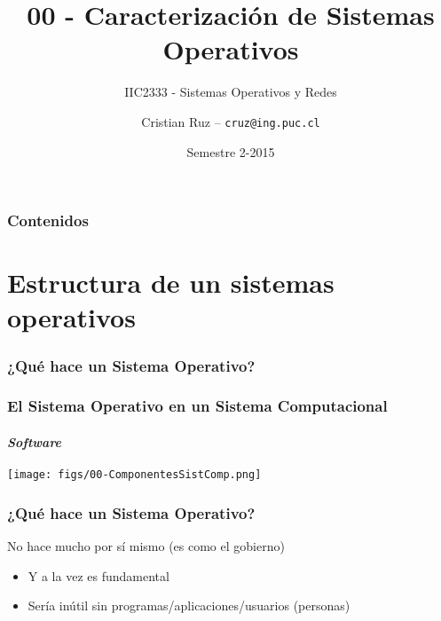 \documentclass[letter]{beamer}
\title[IIC2333] %
{00 - Caracterización de Sistemas Operativos}
\subtitle{IIC2333 - Sistemas Operativos y Redes}
\author[C.Ruz] %
{Cristian Ruz -- {\tt cruz@ing.puc.cl} }
\institute[PUC] %
{
  Departamento de Ciencia de la Computación\\
  Pontificia Universidad Católica de Chile
}
\date[2/2015] %
{Semestre 2-2015}
\begin{document}
\frame{\titlepage}

\begin{frame}
\frametitle{Contenidos}
\tableofcontents
\end{frame}


\section{Estructura de un sistemas operativos}

\begin{frame}
  \frametitle{¿Qué hace un Sistema Operativo?}
  
\end{frame}


\begin{frame}
  \frametitle{El Sistema Operativo en un Sistema Computacional}
  \framesubtitle{{\em Software}}
  
  \begin{center}
    \texttt{[image: figs/00-ComponentesSistComp.png]}
  \end{center}

  
\end{frame}

\begin{frame}
  \frametitle{¿Qué hace un Sistema Operativo?}

  No hace mucho por sí mismo (es como el gobierno)
  \begin{itemize}
    \item<2-> Y a la vez es fundamental
    \item<2-> Sería inútil sin programas/aplicaciones/usuarios (personas)
  \end{itemize}

  
\end{frame}
\end{document}
